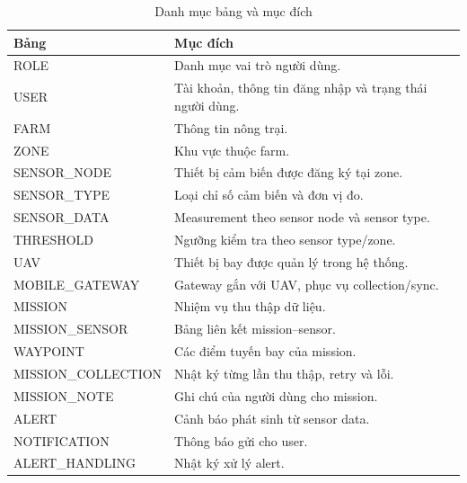 \begin{longtable}{p{3.5cm}p{10cm}}
\caption{Danh mục bảng và mục đích}\label{tab:dictionary}\\
\toprule
Bảng & Mục đích \\
\midrule
ROLE & Danh mục vai trò người dùng.\\
USER & Tài khoản, thông tin đăng nhập và trạng thái người dùng.\\
FARM & Thông tin nông trại.\\
ZONE & Khu vực thuộc farm.\\
SENSOR\_NODE & Thiết bị cảm biến được đăng ký tại zone.\\
SENSOR\_TYPE & Loại chỉ số cảm biến và đơn vị đo.\\
SENSOR\_DATA & Measurement theo sensor node và sensor type.\\
THRESHOLD & Ngưỡng kiểm tra theo sensor type/zone.\\
UAV & Thiết bị bay được quản lý trong hệ thống.\\
MOBILE\_GATEWAY & Gateway gắn với UAV, phục vụ collection/sync.\\
MISSION & Nhiệm vụ thu thập dữ liệu.\\
MISSION\_SENSOR & Bảng liên kết mission--sensor.\\
WAYPOINT & Các điểm tuyến bay của mission.\\
MISSION\_COLLECTION & Nhật ký từng lần thu thập, retry và lỗi.\\
MISSION\_NOTE & Ghi chú của người dùng cho mission.\\
ALERT & Cảnh báo phát sinh từ sensor data.\\
NOTIFICATION & Thông báo gửi cho user.\\
ALERT\_HANDLING & Nhật ký xử lý alert.\\
\bottomrule
\end{longtable}

